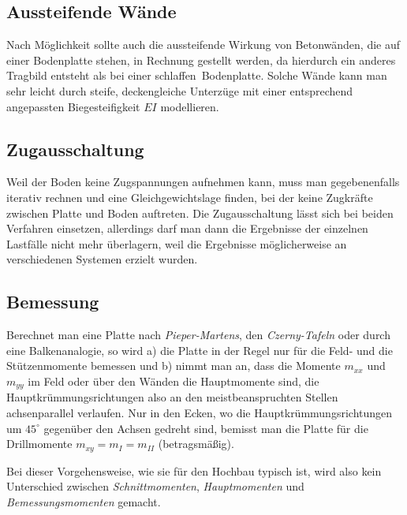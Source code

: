 {\textcolor{sectionTitleBlue}{\subsection{Aussteifende W\"{a}nde}}}
Nach M\"{o}glichkeit sollte auch die aussteifende Wirkung von Betonw\"{a}nden, die auf einer Bodenplatte stehen, in Rechnung gestellt werden, da hierdurch ein anderes Tragbild entsteht als bei einer \glq schlaffen\grq\ Bodenplatte. Solche W\"{a}nde kann man sehr leicht durch steife, deckengleiche Unterz\"{u}ge mit einer entsprechend angepassten Biegesteifigkeit $EI$ modellieren.

{\textcolor{sectionTitleBlue}{\subsection{Zugausschaltung}}}
Weil der Boden keine Zugspannungen aufnehmen kann, muss man gegebenenfalls iterativ rechnen und eine Gleichgewichtslage finden, bei der keine Zugkr\"{a}fte zwischen Platte und Boden auftreten. Die Zugausschaltung l\"{a}sst sich bei beiden Verfahren einsetzen, allerdings darf man dann die Ergebnisse der einzelnen Lastf\"{a}lle nicht mehr \"{u}berlagern, weil die Ergebnisse m\"{o}glicherweise an verschiedenen Systemen erzielt wurden.



{\textcolor{sectionTitleBlue}{\section{Bemessung}}}
Berechnet man eine Platte nach {\em Pieper-Martens\/}, den {\em Czerny-Tafeln\/} oder durch eine Balkenanalogie, so wird a) die Platte in der Regel nur f\"{u}r die Feld- und die St\"{u}tzenmomente bemessen und b) nimmt man an, dass die Momente $m_{xx}$ und $m_{yy}$ im Feld oder \"{u}ber den W\"{a}nden die Hauptmomente sind, die Hauptkr\"{u}mmungsrichtungen also an den meistbeanspruchten Stellen achsenparallel verlaufen. Nur in den Ecken, wo die Hauptkr\"{u}mmungsrichtungen um $45^\circ$ gegen\"{u}ber den Achsen gedreht sind, bemisst man die Platte f\"{u}r die Drillmomente $m_{xy} = m_I = m_{II}$ (betragsm\"{a}{\ss}ig).

Bei dieser Vorgehensweise, wie sie f\"{u}r den Hochbau typisch ist, wird also kein Unterschied zwischen {\em Schnittmomenten\/}, {\em Hauptmomenten\/} und {\em Bemessungsmomenten\/} gemacht.

